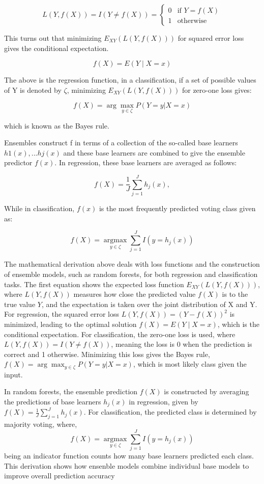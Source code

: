 \documentclass[12pt, a4paper,twoside]{report}
\numberwithin{equation}{chapter}
\begin{document}
\[
L(Y, f(X)) = I(Y \neq f(X)) = 
\begin{cases} 
0 & \text{if } Y = f(X) \\
1 & \text{otherwise}
\end{cases}
\]



This turns out that minimizing \( E_{XY} (L(Y, f(X)))\) for squared error loss gives the conditional expectation.

\[f(X) = E (Y \mid X = x)\]

The above is the regression function, in a classification, if a set of possible values of Y is denoted by \(\zeta\), minimizing  \(E_{XY} (L(Y, f(X)))\) for zero-one loss gives:


\[f(X) = \arg \max_{y \in \zeta} P(Y = y|X = x)\]

which is known as the Bayes rule.

Ensembles construct f in terms of a collection of the so-called base learners \(h1(x),...hj(x)\) and these base learners are combined to give the ensemble predictor $f(x)$. In regression, these base learners are averaged as follows:

\[f(X) = \frac{1}{J} \sum_{j=1}^{J} h_j (x),\]

While in classification, \(f(x)\) is the most frequently predicted voting class given as:

\[f(X) = \underset{y \in \zeta}{\operatorname{argmax}} \sum_{j=1}^{J} I(y = h_j(x))\]

The mathematical derivation above deals with loss functions and the construction of ensemble models, such as random forests, for both regression and classification tasks. The first equation shows the expected loss function \( E_{XY} (L(Y, f(X)))\), where \(L(Y, f(X))\) measures how close the predicted value \(f(X)\) is to the true value \(Y\), and the expectation is taken over the joint distribution of X and Y. For regression, the squared error loss \(L(Y, f(X)) = (Y - f(X))^2\) is minimized, leading to the optimal solution \(f(X) = E (Y \mid X = x)\), which is the conditional expectation. For classification, the zero-one loss is used, where \(L(Y, f(X)) = I(Y \neq f(X))\), meaning the loss is 0 when the prediction is correct and 1 otherwise. Minimizing this loss gives the Bayes rule, \(f(X) = \arg \max_{y \in \zeta} P(Y = y|X = x)\), which is most likely class given the input.

In random forests, the ensemble prediction \(f(X)\) is constructed by averaging the predictions of base learners \(h_j(x)\) in regression, given by \(f(X) = \frac{1}{J} \sum_{j=1}^{J} h_j (x)\). For classification, the predicted class is determined by majority voting, where, \[f(X) = \underset{y \in \zeta}{\operatorname{argmax}} \sum_{j=1}^{J} I(y = h_j(x))\] being an indicator function counts how many base learners predicted each class. This derivation shows how ensenble models combine individual base models to improve overall prediction accuracy
\end{document}
